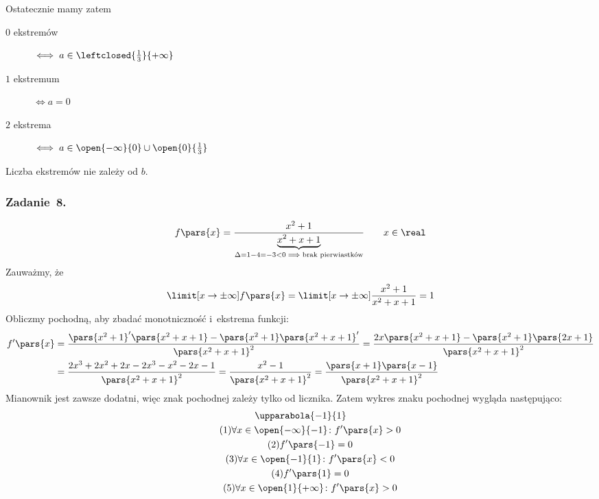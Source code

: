 Ostatecznie mamy zatem
\begin{description}
    \item[\(0\) ekstremów] \(\iff a \in \leftclosed{\frac{1}{3}}{+\infty}\)
    \item[\(1\) ekstremum] \(\iff a = 0\)
    \item[\(2\) ekstrema] \(\iff a \in \open{-\infty}{0} \cup \open{0}{\frac{1}{3}}\)
\end{description}
Liczba ekstremów nie zależy od \(b\).
\subsubsection*{Zadanie~8.}
\begin{equation*}
    f\pars{x}
        = \frac{x^2 + 1}{\underbrace{x^2 + x + 1}_{\Delta = 1 - 4 = -3 < 0 \implies \text{brak pierwiastków}}} \qquad x \in \real
\end{equation*}
Zauważmy, że
\begin{equation*}
    \limit[x \to \pm\infty] f\pars{x}
        = \limit[x \to \pm\infty] \frac{x^2 + 1}{x^2 + x + 1}
        = 1
\end{equation*}
Obliczmy pochodną, aby zbadać monotniczność i~ekstrema funkcji:
\begin{equation*}
    \begin{split}
        f'\pars{x}
            &= \frac{\pars{x^2 + 1}'\pars{x^2 + x + 1} - \pars{x^2 + 1}\pars{x^2 + x + 1}'}{\pars{x^2 + x + 1}^2}
            = \frac{2x\pars{x^2 + x + 1} - \pars{x^2 + 1}\pars{2x + 1}}{\pars{x^2 + x + 1}^2}\\
            &= \frac{2x^3 + 2x^2 + 2x - 2x^3 - x^2 - 2x - 1}{\pars{x^2 + x + 1}^2}
            = \frac{x^2 - 1}{\pars{x^2 + x + 1}^2}
            = \frac{\pars{x + 1}\pars{x - 1}}{\pars{x^2 + x + 1}^2}
    \end{split}
\end{equation*}
Mianownik jest zawsze dodatni, więc znak pochodnej zależy tylko od licznika. Zatem wykres znaku pochodnej wygląda następująco:
\begin{gather*}
    \upparabola{-1}{1}\\
    \tag{\(1\)} \forall x \in \open{-\infty}{-1}\colon f'\pars{x} > 0 \label{2020_11_09:8:first_increase}\\
    \tag{\(2\)} f'\pars{-1} = 0 \label{2020_11_09:8:first_zero}\\
    \tag{\(3\)} \forall x \in \open{-1}{1}\colon f'\pars{x} < 0 \label{2020_11_09:8:decrease}\\
    \tag{\(4\)} f'\pars{1} = 0 \label{2020_11_09:8:second_zero}\\
    \tag{\(5\)} \forall x \in \open{1}{+\infty}\colon f'\pars{x} > 0 \label{2020_11_09:8:second_increase}
\end{gather*}

